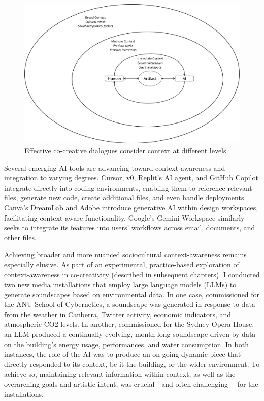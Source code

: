\begin{figure}
    \centering
    \includegraphics[width=0.75\linewidth]{context.png}
    \caption{Effective co-creative dialogues consider context at different levels}
    \label{fig:enter-label}
\end{figure}

Several emerging AI tools are advancing toward context-awareness and integration to varying degrees. \href{https://www.cursor.com/}{Cursor}, \href{https://v0.dev/}{v0}, \href{https://replit.com/ai}{Replit’s AI agent}, and \href{https://github.com/features/copilot}{GitHub Copilot} integrate directly into coding environments, enabling them to reference relevant files, generate new code, create additional files, and even handle deployments. \href{https://www.canva.com/}{Canva’s DreamLab} and \href{https://www.adobe.com/au/products/firefly.html}{Adobe} introduce generative AI within design workspaces, facilitating context-aware functionality. Google’s Gemini Workspace similarly seeks to integrate its features into users’ workflows across email, documents, and other files.

Achieving broader and more nuanced sociocultural context-awareness remains especially elusive. As part of an experimental, practice-based exploration of context-awareness in co-creativity (described in subsequent chapters), I conducted two new media installations that employ large language models (LLMs) to generate soundscapes based on environmental data. In one case, commissioned for the ANU School of Cybernetics, a soundscape was generated in response to data from the weather in Canberra, Twitter activity, economic indicators, and atmospheric CO2 levels. In another, commissioned for the Sydney Opera House, an LLM produced a continually evolving, month-long soundscape driven by data on the building’s energy usage, performances, and water consumption. In both instances, the role of the AI was to produce an on-going dynamic piece that directly responded to its context, be it the building, or the wider environment. To achieve so, maintaining relevant information within context, as well as the overarching goals and artistic intent, was crucial—and often challenging— for the installations.


